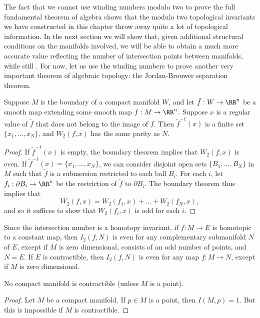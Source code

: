 The fact that we cannot use winding numbers modulo two to prove the full fundamental theorem of algebra shows that the modulo two topological invariants we have constructed in this chapter throw away quite a lot of topological information. In the next section we will show that, given additional structural conditions on the manifolds involved, we will be able to obtain a much more accurate value reflecting the number of intersection points between manifolds, while still . For now, let us use the winding numbers to prove another very important theorem of algebraic topology: the Jordan-Brouwer separation theorem.

\begin{theorem}
    Suppose $M$ is the boundary of a compact manifold $W$, and let $\tilde{f}: W \to \RR^n$ be a smooth map extending some smooth map $f: M \to \RR^n$. Suppose $x$ is a regular value of $\tilde{f}$ that does not belong to the image of $f$. Then $\tilde{f}^{-1}(x)$ is a finite set $\{ x_1, \dots, x_N \}$, and $W_2(f,x)$ has the same parity as $N$.
\end{theorem}
\begin{proof}
    If $\tilde{f}^{-1}(x)$ is empty, the boundary theorem implies that $W_2(f,x)$ is even. If $\tilde{f}^{-1}(x) = \{ x_1, \dots, x_N \}$, we can consider disjoint open sets $\{ B_1, \dots, B_N \}$ in $M$ such that $\tilde{f}$ is a submersion restricted to each ball $B_i$. For each $i$, let $f_i: \partial B_i \to \RR^n$ be the restriction of $\tilde{f}$ to $\partial B_i$. The boundary theorem thus implies that
    \[ W_2(f,x) = W_2(f_1,x) + \dots + W_2(f_N,x), \]
    and so it suffices to show that $W_2(f_i,x)$ is odd for each $i$.
\end{proof}

Since the intersection number is a homotopy invariant, if $f: M \to E$ is homotopic to a constant map, then $I_2(f,N)$ is even for any complementary submanifold $N$ of $E$, except if $M$ is zero dimensional, consists of an odd number of points, and $N = E$. If $E$ is contractible, then $I_2(f,N)$ is even for any map $f: M \to N$, except if $M$ is zero dimensional.

\begin{theorem}
    No compact manifold is contractible (unless $M$ is a point).
\end{theorem}
\begin{proof}
    Let $M$ be a compact manifold. If $p \in M$ is a point, then $I(M,p) = 1$. But this is impossible if $M$ is contractible.
\end{proof}

